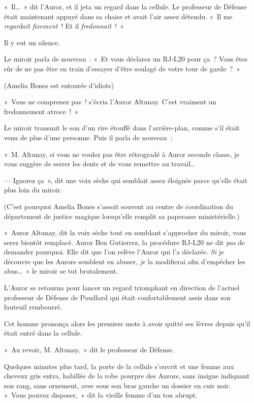 «~Il…~» dit l'Auror, et il jeta un regard dans la cellule. Le professeur de Défense était maintenant appuyé dans sa chaise et avait l'air assez détendu. «~Il me \emph{regardait fixement}~! Et il \emph{fredonnait}~!~»

Il y eut un silence.

Le miroir parla de nouveau~: «~Et vous déclarez un RJ-L20 pour ça~? Vous êtes sûr de ne pas être en train d'essayer d'être soulagé de votre tour de garde~?~»

(Amelia Bones est entourée d'idiots)

«~Vous ne comprenez pas~! s'écria l'Auror Altunay. C'est vraiment un fredonnement atroce~!~»

Le miroir transmit le son d'un rire étouffé dans l'arrière-plan, comme s'il était venu de plus d'une personne. Puis il parla de nouveau~:

«~M. Altunay, si vous ne voulez pas être rétrogradé à Auror seconde classe, je vous suggère de serrer les dents et de vous remettre au travail…

--- Ignorez ça~», dit une voix sèche qui semblait assez éloignée parce qu'elle était plus loin du miroir.

(C'est pourquoi Amelia Bones s'assoit souvent au centre de coordination du département de justice magique lorsqu'elle remplit sa paperasse ministérielle.)

«~Auror Altunay, dit la voix sèche tout en semblant s'approcher du miroir, vous serez bientôt remplacé. Auror Ben Gutierrez, la procédure RJ-L20 ne dit \emph{pas} de demander pourquoi. Elle dit que l'on relève l'Auror qui l'a déclarée. \emph{Si} je découvre que les Aurors semblent en abuser, \emph{je} la modifierai afin d'empêcher les abus…~» le miroir se tut brutalement.

L'Auror se retourna pour lancer un regard triomphant en direction de l'actuel professeur de Défense de Poudlard qui était confortablement assis dans son fauteuil rembourré.

Cet homme prononça alors les premiers mots à avoir quitté ses lèvres depuis qu'il était entré dans la cellule.

«~Au revoir, M. Altunay,~» dit le professeur de Défense.

Quelques minutes plus tard, la porte de la cellule s'ouvrit et une femme aux cheveux gris entra, habillée de la robe pourpre des Aurors, sans insigne indiquant son rang, sans ornement, avec sous son bras gauche un dossier en cuir noir. «~Vous pouvez disposer,~» dit la vieille femme d'un ton abrupt.

